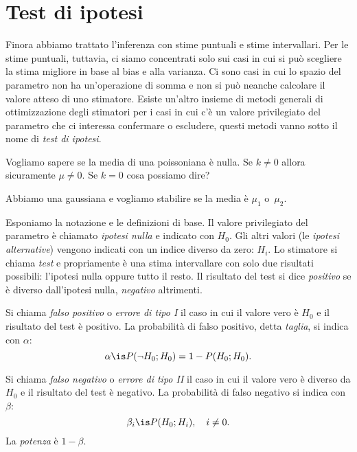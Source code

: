 
\section{Test di ipotesi}

Finora abbiamo trattato l'inferenza con stime puntuali e stime intervallari.
Per le stime puntuali, tuttavia,
ci siamo concentrati solo sui casi in cui si può scegliere la stima migliore in base al bias e alla varianza.
Ci sono casi in cui lo spazio del parametro non ha un'operazione di somma
e non si può neanche calcolare il valore atteso di uno stimatore.
Esiste un'altro insieme di metodi generali di ottimizzazione degli stimatori
per i casi in cui c'è un valore privilegiato del parametro che ci interessa confermare o escludere,
questi metodi vanno sotto il nome di \emph{test di ipotesi}.

\begin{example}
	Vogliamo sapere se la media di una poissoniana è nulla.
	Se $k\neq 0$ allora sicuramente $\mu\neq 0$.
	Se $k=0$ cosa possiamo dire?
\end{example}

\begin{example}
	Abbiamo una gaussiana e vogliamo stabilire se la media è $\mu_1$ o~$\mu_2$.
\end{example}

Esponiamo la notazione e le definizioni di base.
Il valore privilegiato del parametro è chiamato \emph{ipotesi nulla} e indicato con $H_0$.
Gli altri valori (le \emph{ipotesi alternative}) vengono indicati con un indice diverso da zero: $H_i$.
Lo stimatore si chiama \emph{test} e propriamente è una stima intervallare
con solo due risultati possibili: l'ipotesi nulla oppure tutto il resto.
Il risultato del test si dice \emph{positivo} se è diverso dall'ipotesi nulla,
\emph{negativo} altrimenti.

\begin{definition}
	Si chiama \emph{falso positivo} o \emph{errore di tipo I}
	il caso in cui il valore vero è $H_0$ e il risultato del test è positivo.
	La probabilità di falso positivo, detta \emph{taglia}, si indica con $\alpha$:
	\begin{equation*}
		\alpha
		\is P(\neg H_0;H_0) = 1 - P(H_0;H_0).
	\end{equation*}
\end{definition}

\begin{definition}
	Si chiama \emph{falso negativo} o \emph{errore di tipo II}
	il caso in cui il valore vero è diverso da $H_0$ e il risultato del test è negativo.
	La probabilità di falso negativo si indica con $\beta$:
	\begin{equation*}
		\beta_i
		\is P(H_0;H_i), \quad i \neq 0.
	\end{equation*}
	La \emph{potenza} è $1-\beta$.
\end{definition}

